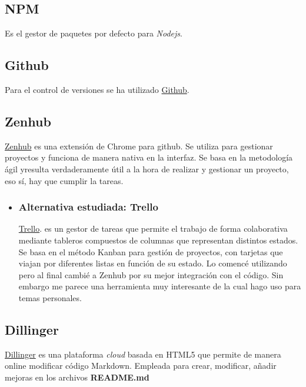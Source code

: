 
  
   \subsection{NPM}\label{otrasherramientas_npm}
Es el gestor de paquetes por defecto para \emph{Nodejs}.
  
   \subsection{Github}\label{otrasherramientas_github}
   Para el control de versiones se ha utilizado \hyperlink{https://www.github.com/}{Github}. 
   
    \subsection{Zenhub}\label{otrasherramientas_zenhub}
    \hyperlink{https://www.zenhub.io/}{Zenhub} es una extensión de Chrome para github. Se utiliza para gestionar proyectos y funciona de manera nativa en la interfaz. Se basa en la metodología ágil yresulta verdaderamente útil a la hora de realizar y gestionar un proyecto, eso sí, hay que cumplir la tareas. 
    
    
\begin{itemize}
 	\item 	 \subsubsection{Alternativa estudiada: Trello}\label{trello}
\hyperlink{https://www.trello.com/}{Trello}.  es un gestor de tareas que permite el trabajo de forma colaborativa mediante tableros compuestos de columnas  que representan distintos estados. Se basa en el método Kanban para gestión de proyectos, con tarjetas que viajan por diferentes listas en función de su estado. Lo comencé utilizando pero al final cambié a Zenhub por su mejor integración con el código. Sin embargo me parece una herramienta muy interesante de la cual hago uso para temas personales.  
\end{itemize}


   \subsection{Dillinger}\label{otrasherramientas_dillinger}
    \hyperlink{https://www.zenhub.io/}{Dillinger} es una plataforma \emph{cloud}  basada en HTML5  que permite de manera online modificar código Markdown. Empleada para crear, modificar, añadir mejoras en los archivos \textbf{README.md}
     
     




